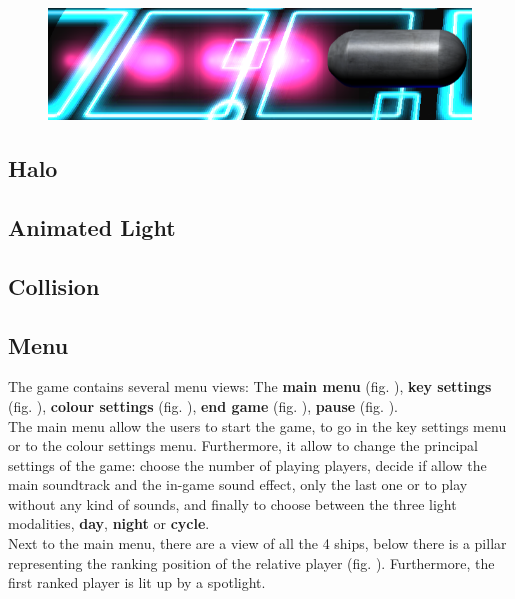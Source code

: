 \documentclass[11pt]{article}
\begin{document}
\begin{figure}
\begin{minipage}[b]{0.276\linewidth}
			\caption{}
			\label{fig:toro}
		\end{minipage}
		\begin{minipage}[b]{0.6\linewidth}
			\includegraphics[width=\linewidth]{motor}
			\caption{}
			\label{fig:motor}
		\end{minipage}
	\end{figure}





\subsection{Halo}
\subsection{Animated Light}
\subsection{Collision}
\subsection{Menu}
	The game contains several menu views: The \textbf{main menu} (fig. ), \textbf{key settings} (fig. ), \textbf{colour settings} (fig. ), \textbf{end game} (fig. ), \textbf{pause} (fig. ).\\
	
	The main menu allow the users to start the game, to go in the key settings menu or to the colour settings menu.
	Furthermore, it allow to change the principal settings of the game: choose the number of playing players, decide if allow the main soundtrack and the in-game sound effect, only the last one or to play without any kind of sounds, and finally to choose between the three light modalities, \textbf{day}, \textbf{night} or \textbf{cycle}.\\
	Next to the main menu, there are a view of all the 4 ships, below there is a pillar representing the ranking position of the relative player (fig. ).
	Furthermore, the first ranked player is lit up by a spotlight.\\
	
\end{document}

